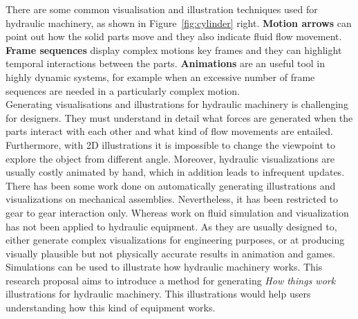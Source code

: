 \documentclass[11pt]{report}
\begin{document}
There are some common visualisation and illustration techniques used for hydraulic machinery, as shown in Figure~\ref{fig:cylinder} right.
\textbf{Motion arrows} can point out how the solid parts move and they also indicate fluid flow movement.
\textbf{Frame sequences} display complex motions key frames and they can highlight temporal interactions between the parts.
\textbf{Animations} are an useful tool in highly dynamic systems, for example when an excessive number of frame sequences are needed in a particularly complex motion.\\

Generating visualisations and illustrations for hydraulic machinery is challenging for designers.
They must understand in detail what forces are generated when the parts interact with each other and what kind of flow movements are entailed.
Furthermore, with 2D illustrations it is impossible to change the viewpoint to explore the object from different angle.
Moreover, hydraulic visualizations are usually costly animated by hand, which in addition leads to infrequent updates.\\

There has been some work done on automatically generating illustrations and visualizations on mechanical assemblies.
Nevertheless, it has been restricted to gear to gear interaction only.
Whereas work on fluid simulation and visualization has not been applied to hydraulic equipment.
As they are usually designed to, either generate complex visualizations for engineering purposes, or at producing visually plausible but not physically accurate results in animation and games.\\

Simulations can be used to illustrate how hydraulic machinery works.
This research proposal aims to introduce a method for generating \textit{How things work} illustrations for hydraulic machinery.
This illustrations would help users understanding how this kind of equipment works.\\
\end{document}
